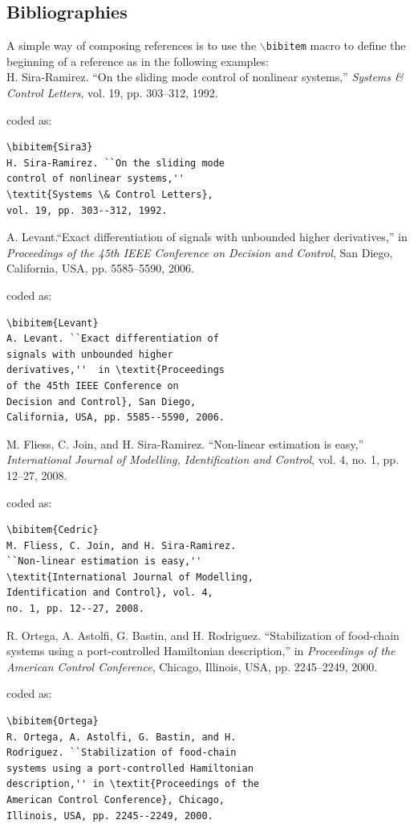 \documentclass[lettersize,journal]{IEEEtran}
\begin{document}
\subsection{Bibliographies}
 A simple way of composing references is to use the $\backslash${\tt{bibitem}} macro to define the beginning of a reference as in the following examples:\\


\noindent [6] H. Sira-Ramirez. ``On the sliding mode control of nonlinear systems,'' \textit{Systems \& Control Letters}, vol. 19, pp. 303--312, 1992.

\noindent coded as:
\begin{verbatim}
\bibitem{Sira3}
H. Sira-Ramirez. ``On the sliding mode
control of nonlinear systems,''
\textit{Systems \& Control Letters},
vol. 19, pp. 303--312, 1992.
\end{verbatim}

\noindent [7] A. Levant.``Exact differentiation of signals with unbounded higher derivatives,''  in \textit{Proceedings of the 45th IEEE Conference on Decision and Control}, San Diego, California, USA, pp. 5585--5590, 2006.

\noindent coded as:
\begin{verbatim}\bibitem{Levant}
A. Levant. ``Exact differentiation of
signals with unbounded higher
derivatives,''  in \textit{Proceedings
of the 45th IEEE Conference on
Decision and Control}, San Diego,
California, USA, pp. 5585--5590, 2006.
\end{verbatim}


\noindent [8] M. Fliess, C. Join, and H. Sira-Ramirez. ``Non-linear estimation is easy,'' \textit{International Journal of Modelling, Identification and Control}, vol. 4, no. 1, pp. 12--27, 2008.

\noindent coded as:
\begin{verbatim}
\bibitem{Cedric}
M. Fliess, C. Join, and H. Sira-Ramirez.
``Non-linear estimation is easy,''
\textit{International Journal of Modelling,
Identification and Control}, vol. 4,
no. 1, pp. 12--27, 2008.
\end{verbatim}

\noindent [9] R. Ortega, A. Astolfi, G. Bastin, and H. Rodriguez. ``Stabilization of food-chain systems using a port-controlled Hamiltonian description,'' in \textit{Proceedings of the American Control Conference}, Chicago, Illinois, USA, pp. 2245--2249, 2000.

\noindent coded as:
\begin{verbatim}
\bibitem{Ortega}
R. Ortega, A. Astolfi, G. Bastin, and H.
Rodriguez. ``Stabilization of food-chain
systems using a port-controlled Hamiltonian
description,'' in \textit{Proceedings of the
American Control Conference}, Chicago,
Illinois, USA, pp. 2245--2249, 2000.
\end{verbatim}
\end{document}
